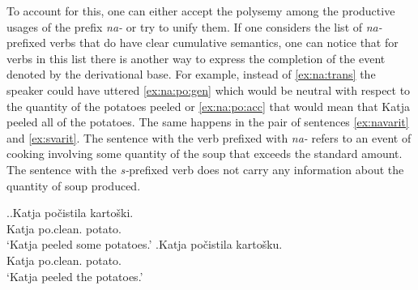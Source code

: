 %
%

To account for this, one can either accept the polysemy among the productive usages of the prefix \textit{na-} or try to unify them. If one considers the list of \textit{na-}prefixed verbs that do have clear cumulative semantics, one can notice that for verbs in this list there is another way to express the completion of the event denoted by the derivational base. For example, instead of \ref{ex:na:trans} the speaker could have uttered \ref{ex:na:po:gen} which would be neutral with respect to the quantity of the potatoes peeled or \ref{ex:na:po:acc} that would mean that Katja peeled all of the potatoes. The same happens in the pair of sentences \ref{ex:navarit} and \ref{ex:svarit}. The sentence with the verb prefixed with \textit{na-} refers to an event of cooking involving some quantity of the soup that exceeds the standard amount. The sentence with the \textit{s-}prefixed verb does not carry any information about the quantity of soup produced.

\ex.\label{ex:na:po}\ag.\label{ex:na:po:gen}Katja po\v{c}istila karto\v{s}ki.\\
Katja po.clean. potato.\\
\trans `Katja peeled some potatoes.'
\bg.\label{ex:na:po:acc}Katja po\v{c}istila karto\v{s}ku.\\
Katja po.clean. potato.\\
\trans `Katja peeled the potatoes.'

